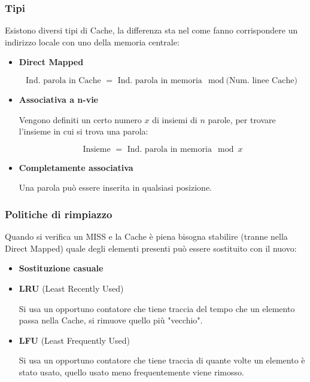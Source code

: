 \documentclass{article}
\begin{document}
\newpage

\subsubsection{Tipi}

Esistono diversi tipi di Cache, la differenza sta nel come fanno corrispondere un indirizzo locale con uno della memoria centrale:
\begin{itemize}
    \item \textbf{Direct Mapped}

        $$\text{Ind. parola in Cache }=\text{ Ind. parola in memoria}\mod{\text{(Num. linee Cache)}}$$

    \item \textbf{Associativa a n-vie}

        Vengono definiti un certo numero $x$ di insiemi di $n$ parole, per trovare l'insieme in cui si trova una parola:

        $$\text{Insieme }=\text{ Ind. parola in memoria}\mod{x}$$

    \item \textbf{Completamente associativa}

        Una parola può essere inserita in qualsiasi posizione.\newline
        
\end{itemize}

\subsubsection{Politiche di rimpiazzo}

Quando si verifica un MISS e la Cache è piena bisogna stabilire (tranne nella Direct Mapped) quale degli elementi presenti può essere sostituito con il nuovo:
\begin{itemize}
    \item \textbf{Sostituzione casuale}
    \item \textbf{LRU} (Least Recently Used)

        Si usa un opportuno contatore che tiene traccia del tempo che un elemento passa nella Cache, si rimuove quello più "vecchio".
    
    \item \textbf{LFU} (Least Frequently Used)

        Si usa un opportuno contatore che tiene traccia di quante volte un elemento è stato usato, quello usato meno frequentemente viene rimosso.\newline
    
\end{itemize}
\end{document}
